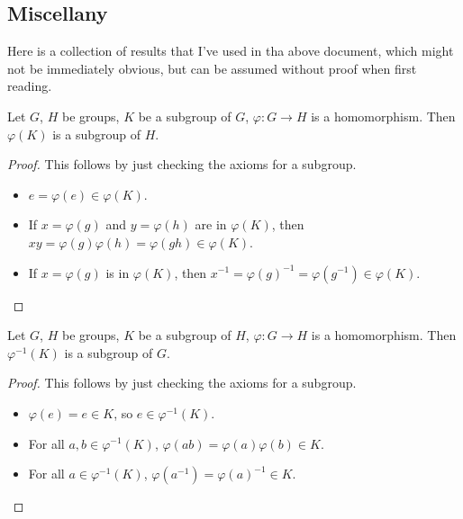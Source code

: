 \documentclass{article}
\begin{document}
    \begin{appendix}

    \section{Miscellany}

    Here is a collection of results that I've used in tha above document, which might not be immediately obvious, but can be assumed without proof when first reading.

    \begin{lemma*}
        Let $G$, $H$ be groups, $K$ be a subgroup of $G$, $\varphi : G \to H$ is a homomorphism. Then $\varphi(K)$ is a subgroup of $H$.
    \end{lemma*}

    \begin{proof}
        This follows by just checking the axioms for a subgroup.
        \begin{itemize}
            \item $e = \varphi(e) \in \varphi(K)$.
            \item If $x = \varphi(g)$ and $y = \varphi(h)$ are in $\varphi(K)$, then $xy = \varphi(g)\varphi(h) = \varphi(gh) \in \varphi(K)$.
            \item If $x = \varphi(g)$ is in $\varphi(K)$, then $x^{-1} = \varphi(g)^{-1} = \varphi(g^{-1}) \in \varphi(K)$.
        \end{itemize}
    \end{proof}

    \begin{lemma*}
        Let $G$, $H$ be groups, $K$ be a subgroup of $H$, $\varphi : G \to H$ is a homomorphism. Then $\varphi^{-1}(K)$ is a subgroup of $G$. 
    \end{lemma*}

    \begin{proof}
        This follows by just checking the axioms for a subgroup.
        \begin{itemize}
            \item $\varphi(e) = e \in K$, so $e \in \varphi^{-1}(K)$.
            \item For all $a, b \in \varphi^{-1}(K)$, $\varphi(ab) = \varphi(a)\varphi(b) \in K$.
            \item For all $a \in \varphi^{-1}(K)$, $\varphi(a^{-1}) = \varphi(a)^{-1} \in K$.
        \end{itemize}
    \end{proof}


\end{appendix}
\end{document}
